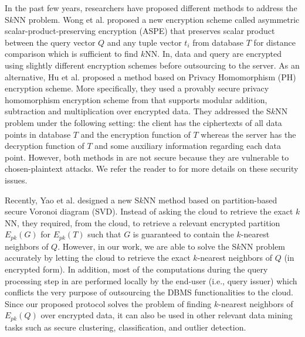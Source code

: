 \documentclass{article}
\begin{document}
In the past few years, researchers have proposed different methods 
\cite{wong2009secure,hu2011processing,yaosecure} to  address the S$k$NN problem. 
Wong et al.\cite{wong2009secure} proposed a new encryption scheme called asymmetric 
scalar-product-preserving encryption (ASPE) that preserves scalar product  
between the query vector $Q$ and any tuple vector $t_i$ from database $T$ for 
distance comparison which is sufficient to find $k$NN. 
In\cite{wong2009secure}, data and query are encrypted using 
slightly different encryption schemes before outsourcing to the server.
As an alternative, Hu et al.\cite{hu2011processing} proposed a method based on Privacy 
Homomorphism (PH) encryption scheme. More specifically, they used a provably 
secure privacy homomorphism encryption scheme from\cite{domingo2002provably} 
that supports modular addition, subtraction and multiplication over encrypted data. They addressed 
the S$k$NN problem under the following setting: the client has the ciphertexts of all data 
points in database $T$ and the encryption function of $T$ whereas the server has 
the decryption function of $T$ and some auxiliary information regarding each data 
point. However, both methods in \cite{wong2009secure,hu2011processing} are not secure because they are 
vulnerable to chosen-plaintext attacks. We refer the reader to\cite{yaosecure} for more details 
on these security issues.

Recently, Yao et al.\cite{yaosecure} designed a new S$k$NN method based on partition-based 
secure Voronoi diagram (SVD). Instead of asking the cloud to retrieve the exact $k$NN, 
they required, from the cloud, to retrieve a relevant encrypted partition $E_{pk}(G)$ for 
$E_{pk}(T)$ such that $G$ is guaranteed to contain the $k$-nearest neighbors of $Q$. 
However, in our work, we are able to solve the S$k$NN problem accurately by letting the  
cloud to retrieve the exact $k$-nearest neighbors of $Q$ (in encrypted form). 
In addition, most of the computations during the query 
processing step in \cite{hu2011processing,yaosecure} are performed locally by the end-user (i.e., query issuer)  
which conflicts the very purpose of outsourcing the DBMS functionalities to the cloud. 
Since our proposed protocol solves the problem of finding $k$-nearest neighbors 
of $E_{pk}(Q)$ over encrypted data, 
it can also be used in other relevant data mining tasks 
such as secure clustering, classification, and outlier detection. 
\end{document}
